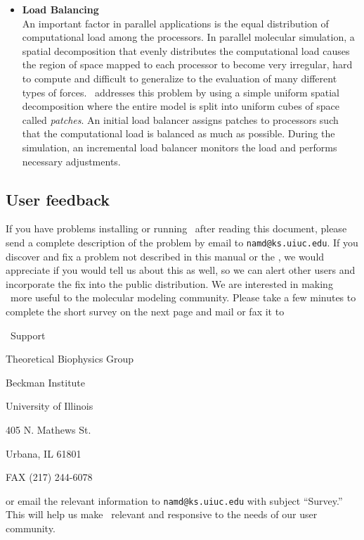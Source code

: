 \begin{itemize}
\item{\bf Load Balancing}\\
An important factor in parallel applications is the equal distribution
of computational load among the processors. In parallel molecular simulation,
a spatial decomposition that evenly distributes the computational load
causes the region of space mapped to each processor to become very irregular, 
hard to compute and difficult to generalize to the evaluation of many different
types of forces.  \NAMD\ addresses this problem by using a simple uniform 
spatial decomposition where the entire model is split into uniform cubes of 
space called {\em patches}. An initial load balancer assigns patches
to processors such that the computational load is balanced as much as possible.
During the simulation, an incremental load balancer monitors the load
and performs necessary adjustments.

\end{itemize}

\subsection{User feedback}

If you have problems installing or running \NAMD\ after
reading this document, please send a
complete description of the problem by email to {\tt namd@ks.uiuc.edu}.  If
you discover and fix a problem not described in this manual or the
\PG, we would
appreciate if you would tell us about this as well, so we can alert
other users and incorporate the fix into the public distribution.
\prettypar
We are interested in making \NAMD\ more useful to the molecular modeling
community.  Please take a few minutes to complete the short survey on
the next page and mail or fax it to

\bigskip

\NAMD\ Support

Theoretical Biophysics Group

Beckman Institute

University of Illinois

405 N. Mathews St.

Urbana, IL  61801

FAX (217) 244-6078

\bigskip

\noindent or email the relevant information
to {\tt namd@ks.uiuc.edu} with subject ``Survey.''  
This will help
us make \NAMD\ relevant and responsive to the needs of our user
community.

